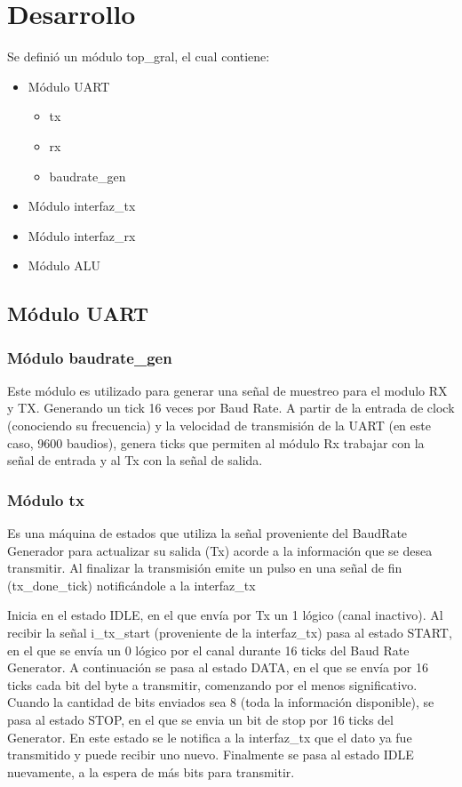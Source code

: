 \documentclass[a4paper]{article}
\begin{document}
\newpage

\section{Desarrollo}

Se definió un módulo top\_gral, el cual contiene:
    \begin{itemize}
        \item Módulo UART
            \begin{itemize}
            \item tx 
            \item rx
            \item baudrate\_gen
            \end{itemize}
        \item Módulo interfaz\_tx
        \item Módulo interfaz\_rx
        \item Módulo ALU
    \end{itemize}

\subsection{Módulo UART}
\subsubsection{Módulo baudrate\_gen}
Este módulo es utilizado para generar una señal de muestreo para el modulo RX y TX. Generando un tick 16 veces por Baud Rate.
A partir de la entrada de clock (conociendo su frecuencia) y la velocidad de transmisión de la UART (en este caso, 9600 baudios), genera ticks que permiten al módulo Rx trabajar con la señal de entrada y al Tx con la señal de salida.

\subsubsection{Módulo tx}
Es una máquina de estados que utiliza la señal proveniente del BaudRate Generador para actualizar su salida (Tx) acorde a la información que
se desea transmitir. Al finalizar la transmisión emite un pulso en una señal de fin (tx\_done\_tick) notificándole a la interfaz\_tx

Inicia en el estado IDLE, en el que envía por Tx un 1 lógico (canal inactivo). Al recibir la señal i\_tx\_start (proveniente de la interfaz\_tx) pasa al estado START, en el que se envía un 0 lógico por el canal durante 16 ticks del Baud Rate Generator.
A continuación se pasa al estado DATA, en el que se envía por 16 ticks cada bit del byte a transmitir, comenzando por el menos significativo. Cuando la cantidad de bits enviados sea 8 (toda la información disponible), se pasa al estado STOP, en el que se envia un bit de stop por 16 ticks del Generator. En este estado se le notifica a la interfaz\_tx que el dato ya fue transmitido y puede recibir uno nuevo.
Finalmente se pasa al estado IDLE nuevamente, a la espera de más bits para transmitir.
\end{document}
